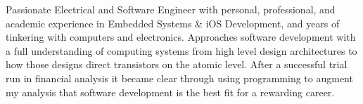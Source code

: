 

\begin{cvparagraph}

Passionate Electrical and Software Engineer with personal, professional, and academic experience in Embedded Systems \& iOS Development, and years of tinkering with computers and electronics. Approaches software development with a full understanding of computing systems from high level design architectures to how those designs direct transistors on the atomic level. After a successful trial run in financial analysis it became clear through using programming to augment my analysis that software development is the best fit for a rewarding career.

\end{cvparagraph}
